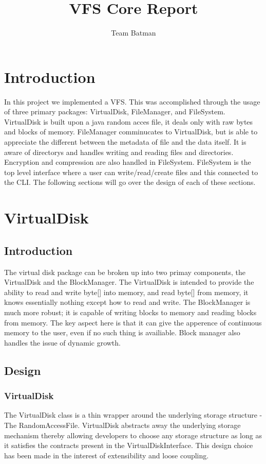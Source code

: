 \documentclass[12pt]{article}
\begin{document}
\title{VFS Core Report}
\author{Team Batman}
\maketitle

\section{Introduction}
In this project we implemented a VFS.  This was accomplished through the usage of three primary packages: VirtualDisk, FileManager, and FileSystem.  VirtualDisk is built upon a java random acces file, it deals only with raw bytes and blocks of memory.  FileManager comminucates to VirtualDisk, but is able to appreciate the different between the metadata of file and the data itself.  It is aware of directorys and handles writing and reading files and directories.  Encryption and compression are also handled in FileSystem.  FileSystem is the top level interface where a user can write/read/create files and this connected to the CLI.  The following sections will go over the design of each of these sections.

\section{VirtualDisk}

\subsection{Introduction}
The virtual disk package can be broken up into two primay components, the VirtualDisk and the BlockManager.  The VirtualDisk is intended to provide the ability to read and write byte[] into memory, and read byte[] from memory, it knows essentially nothing except how to read and write. The BlockManager is much more robust; it is capable of writing blocks to memory and reading blocks from memory.  The key aspect here is that it can give the apperence of continuous memory to the user, even if no such thing is availiable.  Block manager also handles the issue of dynamic growth. 

\subsection{Design}

\subsubsection{VirtualDisk}
The VirtualDisk class is a thin wrapper around the underlying storage structure  - The RandomAccessFile. VirtualDisk abstracts away the underlying storage mechanism thereby allowing developers to choose any storage structure as long as it satisfies the contracts present in the VirtualDiskInterface. This design choice has been made in the interest of extensibility and loose coupling.
\end{document}
